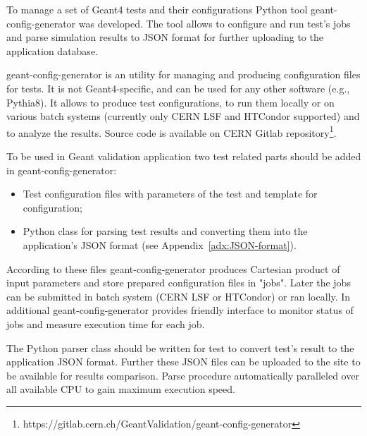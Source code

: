 To manage a set of Geant4 tests and their configurations Python tool geant-config-generator was developed. The tool allows to configure and run test's jobs and parse simulation results to JSON format for further uploading to the application database.

geant-config-generator is an utility for managing and producing configuration files for tests. It is not Geant4-specific, and can be used for any other software (e.g., Pythia8). It allows to produce test configurations, to run them locally or on various batch systems (currently only CERN LSF and HTCondor supported) and to analyze the results. Source code is available on
CERN Gitlab repository\footnote{https://gitlab.cern.ch/GeantValidation/geant-config-generator}.

To be used in Geant validation application two test related parts should be added in geant-config-generator:

\begin{itemize}
	\item Test configuration files with parameters of the test and template for configuration;
	\item Python class for parsing test results and converting them into the application's JSON format (see Appendix~\ref{adx:JSON-format}).
\end{itemize}

According to these files geant-config-generator produces Cartesian product of input parameters and store prepared configuration files in "jobs". Later the jobs can be submitted in batch system (CERN LSF or HTCondor) or ran locally. In additional geant-config-generator provides friendly interface to monitor status of jobs and measure execution time for each job.

The Python parser class should be written for test to convert test's result to the application JSON format. Further these JSON files can be uploaded to the site to be available for results comparison.
Parse procedure automatically paralleled over all available CPU to gain maximum execution speed.




